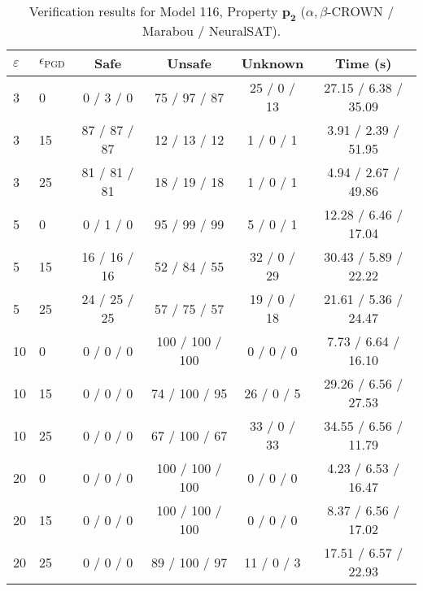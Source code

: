\begin{table}[htbp]\centering
\caption{\small Verification results for Model 116, Property $\mathbf{p_{2}}$ ($\alpha,\beta$-CROWN / Marabou / NeuralSAT).}
\label{tab:model116_p2}
\begin{tabular}{llcccc}
\toprule
$\varepsilon$ & $\epsilon_{\scriptscriptstyle\mathrm{PGD}}$ & Safe & Unsafe & Unknown & Time (s) \\
\midrule
3 & 0 & 0 / 3 / 0 & 75 / 97 / 87 & 25 / 0 / 13 & 27.15 / 6.38 / 35.09 \\
3 & 15 & 87 / 87 / 87 & 12 / 13 / 12 & 1 / 0 / 1 & 3.91 / 2.39 / 51.95 \\
3 & 25 & 81 / 81 / 81 & 18 / 19 / 18 & 1 / 0 / 1 & 4.94 / 2.67 / 49.86 \\
5 & 0 & 0 / 1 / 0 & 95 / 99 / 99 & 5 / 0 / 1 & 12.28 / 6.46 / 17.04 \\
5 & 15 & 16 / 16 / 16 & 52 / 84 / 55 & 32 / 0 / 29 & 30.43 / 5.89 / 22.22 \\
5 & 25 & 24 / 25 / 25 & 57 / 75 / 57 & 19 / 0 / 18 & 21.61 / 5.36 / 24.47 \\
10 & 0 & 0 / 0 / 0 & 100 / 100 / 100 & 0 / 0 / 0 & 7.73 / 6.64 / 16.10 \\
10 & 15 & 0 / 0 / 0 & 74 / 100 / 95 & 26 / 0 / 5 & 29.26 / 6.56 / 27.53 \\
10 & 25 & 0 / 0 / 0 & 67 / 100 / 67 & 33 / 0 / 33 & 34.55 / 6.56 / 11.79 \\
20 & 0 & 0 / 0 / 0 & 100 / 100 / 100 & 0 / 0 / 0 & 4.23 / 6.53 / 16.47 \\
20 & 15 & 0 / 0 / 0 & 100 / 100 / 100 & 0 / 0 / 0 & 8.37 / 6.56 / 17.02 \\
20 & 25 & 0 / 0 / 0 & 89 / 100 / 97 & 11 / 0 / 3 & 17.51 / 6.57 / 22.93 \\
\bottomrule
\end{tabular}
\end{table}
